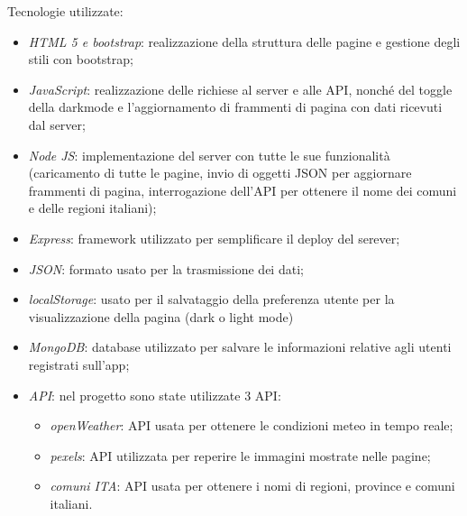 Tecnologie utilizzate:
\begin{itemize}
    \item \emph{HTML 5 e bootstrap}: realizzazione della struttura delle pagine e gestione degli stili con bootstrap;
    \item \emph{JavaScript}: realizzazione delle richiese al server e alle API, nonché del toggle della darkmode e l'aggiornamento 
    di frammenti di pagina con dati ricevuti dal server; 
    \item \emph{Node JS}: implementazione del server con tutte le sue funzionalità (caricamento di tutte le pagine, 
    invio di oggetti JSON per aggiornare frammenti di pagina, interrogazione dell'API per ottenere il nome dei comuni e delle 
    regioni italiani);
    \item \emph{Express}: framework utilizzato per semplificare il deploy del serever;
    \item \emph{JSON}: formato usato per la trasmissione dei dati;
    \item \emph{localStorage}: usato per il salvataggio della preferenza utente per la visualizzazione della pagina (dark o light mode)
    \item \emph{MongoDB}: database utilizzato per salvare le informazioni relative agli utenti registrati sull'app;
    \item \emph{API}: nel progetto sono state utilizzate 3 API:
    \begin{itemize}
        \item \emph{openWeather}: API usata per ottenere le condizioni meteo in tempo reale;
        \item \emph{pexels}: API utilizzata per reperire le immagini mostrate nelle pagine;
        \item \emph{comuni ITA}: API usata per ottenere i nomi di regioni, province e comuni italiani.
    \end{itemize}
\end{itemize}

